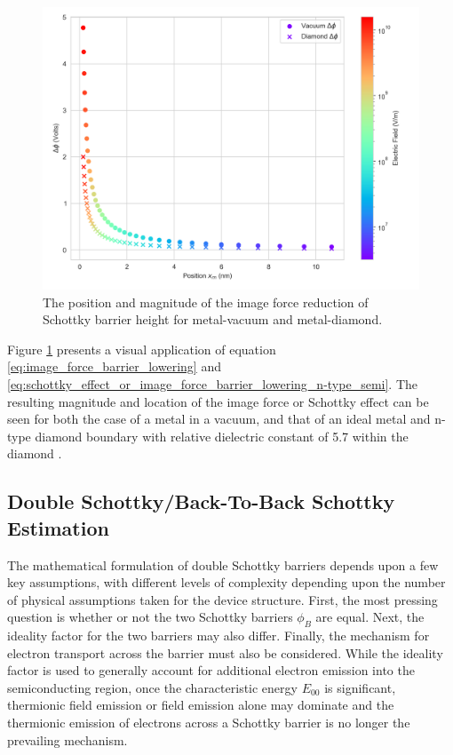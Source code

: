 \begin{refsection}
\begin{figure}[H]
    \centering
    \includegraphics[width=\textwidth]{Chapter2/Figs/Raster/barrier_lowering_image_charge.png}
    \caption{The position and magnitude of the image force reduction of Schottky barrier height for metal-vacuum and metal-diamond.}
    \label{fig:pe_image_charge_reduction}
\end{figure}

Figure \ref{fig:pe_image_charge_reduction} presents a visual application of equation \ref{eq:image_force_barrier_lowering} and \ref{eq:schottky_effect_or_image_force_barrier_lowering_n-type_semi}. The resulting magnitude and location of the image force or Schottky effect can be seen for both the case of a metal in a vacuum, and that of an ideal metal and n-type diamond boundary with relative dielectric constant of 5.7 within the diamond \cite{Fontanella1977, Zaitsev2010-vd}.

\subsection{Double Schottky/Back-To-Back Schottky Estimation}
The mathematical formulation of double Schottky barriers depends upon a few key assumptions, with different levels of complexity depending upon the number of physical assumptions taken for the device structure. First, the most pressing question is whether or not the two Schottky barriers $\phi_{B}$ are equal. Next, the ideality factor for the two barriers may also differ. Finally, the mechanism for electron transport across the barrier must also be considered. While the ideality factor is used to generally account for additional electron emission into the semiconducting region, once the characteristic energy $E_{00}$ is significant, thermionic field emission or field emission alone may dominate and the thermionic emission of electrons across a Schottky barrier is no longer the prevailing mechanism. 


\end{refsection}
